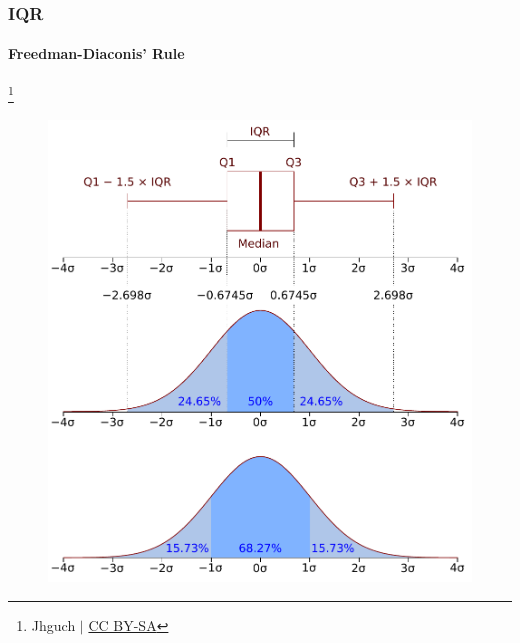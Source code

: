 \documentclass[mathserif]{beamer}
\begin{document}
    \begin{frame}
        \frametitle{IQR}
        \framesubtitle{Freedman-Diaconis' Rule}

        \let\thefootnote\relax\footnote{Jhguch $|$ \href{https://creativecommons.org/licenses/by-sa/2.5}{CC BY-SA}}

        \begin{figure}
            \label{fig:iqr}
            \includegraphics[scale=0.5]{res/Boxplot_vs_PDF.pdf}
        \end{figure}

    \end{frame}
\end{document}
